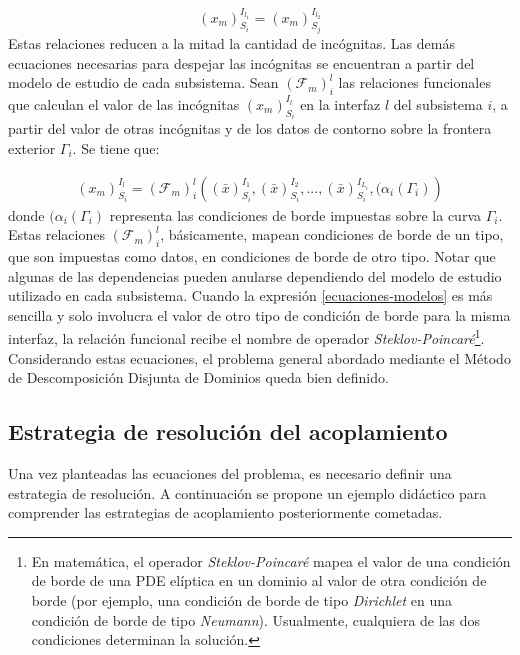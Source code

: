 \begin{equation}
{(x_m)_{S_i}^{I_{l_1}}}={(x_m)_{S_j}^{I_{l_2}}}
\label{continuidad}
\end{equation}
Estas relaciones reducen a la mitad la cantidad de incógnitas.
Las demás ecuaciones necesarias para despejar las incógnitas se encuentran a partir del modelo de estudio de cada subsistema. 
Sean $(\mathscr{F}_m)_{i}^{l}$ las relaciones funcionales que calculan el valor de las incógnitas ${(x_m)_{S_i}^{I_l}}$ en la interfaz $l$ del subsistema $i$,
a partir del valor de otras incógnitas y de los datos de contorno sobre la frontera exterior $\Gamma_i$.
Se tiene que:

\begin{equation}
\begin{split}
  (x_m)_{S_i}^{I_l} = (\mathscr{F}_m)_{i}^{l} \left ( (\bar{x})_{S_i}^{I_1}, (\bar{x})_{S_i}^{I_2}, ..., 
  (\bar{x})_{S_i}^{I_{L_i}}, (\alpha_i({\Gamma_i}) \right )
\end{split}
\label{ecuaciones-modelos}
\end{equation}
donde $(\alpha_i({\Gamma_i})$ representa las condiciones de borde impuestas sobre la curva $\Gamma_i$.
Estas relaciones $(\mathscr{F}_m)_{i}^{l}$, básicamente, mapean condiciones de borde de un tipo, que son impuestas como datos, en condiciones de borde de otro tipo.
Notar que algunas de las dependencias pueden anularse dependiendo del modelo de estudio utilizado en cada subsistema.
Cuando la expresión \ref{ecuaciones-modelos} es más sencilla y solo involucra el valor de otro tipo de condición de borde para la misma interfaz,
la relación funcional recibe el nombre de operador \textit{Steklov-Poincaré}\footnote{
En matemática, el operador \textit{Steklov-Poincaré} mapea el valor de una condición de borde de una PDE elíptica en un dominio al valor
de otra condición de borde (por ejemplo, una condición de borde de tipo \textit{Dirichlet} en una condición de borde de tipo \textit{Neumann}).
Usualmente, cualquiera de las dos condiciones determinan la solución.
}.
Considerando estas ecuaciones, el problema general abordado mediante el Método de Descomposición Disjunta de Dominios queda bien definido.

\subsection*{Estrategia de resolución del acoplamiento}
\label{1:ecuaciones}
Una vez planteadas las ecuaciones del problema, es necesario definir una estrategia de resolución.
A continuación se propone un ejemplo didáctico para comprender las estrategias de acoplamiento posteriormente cometadas.


